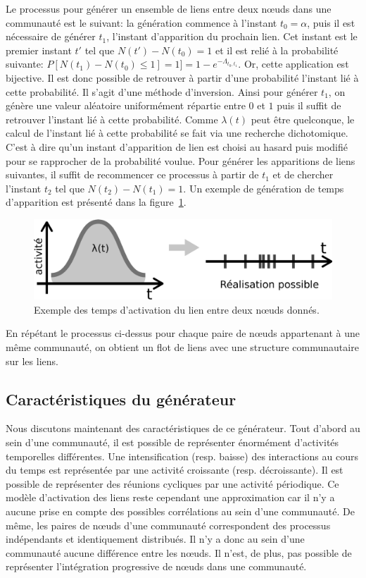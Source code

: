 Le processus pour générer un ensemble de liens entre deux n\oe{}uds dans une communauté est le suivant: la génération commence à l'instant $t_0=\alpha$, puis il est nécessaire de générer $t_1$, l'instant d'apparition du prochain lien.
Cet instant est le premier instant $t'$ tel que $N(t')- N(t_0)=1$ et il est relié à la probabilité suivante: $P [N(t_1) - N(t_0) \leq 1] = 1]=1-e^{-\Lambda_{t_0,t_1}}$.
Or, cette application est bijective.
Il est donc possible de retrouver à partir d'une probabilité l'instant lié à cette probabilité.
Il s'agit d'une méthode d'inversion.
Ainsi pour générer $t_1$, on génère une valeur aléatoire uniformément répartie entre $0$ et $1$ puis il suffit de retrouver l'instant lié à cette probabilité.
Comme $\lambda(t)$ peut être quelconque, le calcul de l'instant lié à cette probabilité se fait via une recherche dichotomique.
C'est à dire qu'un instant d'apparition de lien est choisi au hasard puis modifié pour se rapprocher de la probabilité voulue.
Pour générer les apparitions de liens suivantes, il suffit de recommencer ce processus à partir de $t_1$ et de chercher l'instant $t_2$ tel que $N(t_2)- N(t_1)=1$.
Un exemple de génération de temps d'apparition est présenté dans la figure~\ref{fig:qualite_Activation}.


\begin{figure}
\centering
\includegraphics[width=0.6\linewidth]{img/Qualite/Activation}
\caption{Exemple des temps d'activation du lien entre deux n\oe{}uds donnés.}
\label{fig:qualite_Activation}
\end{figure}


En répétant le processus ci-dessus pour chaque paire de n\oe{}uds appartenant à une même communauté, on obtient un flot de liens avec une structure communautaire sur les liens.

\subsection{Caractéristiques du générateur}

Nous discutons maintenant des caractéristiques de ce générateur.
Tout d'abord au sein d'une communauté, il est possible de représenter énormément d'activités temporelles différentes.
Une intensification (resp. baisse) des interactions au cours du temps est représentée par une activité croissante (resp. décroissante).
Il est possible de représenter des réunions cycliques par une activité périodique. 
Ce modèle d'activation des liens reste cependant une approximation car il n'y a aucune prise en compte des possibles corrélations au sein d'une communauté.
De même, les paires de n\oe{}uds d'une communauté correspondent des processus indépendants et identiquement distribués.
Il n'y a donc au sein d'une communauté aucune différence entre les n\oe{}uds.
Il n'est, de plus, pas possible de représenter l'intégration progressive de n\oe{}uds dans une communauté.

